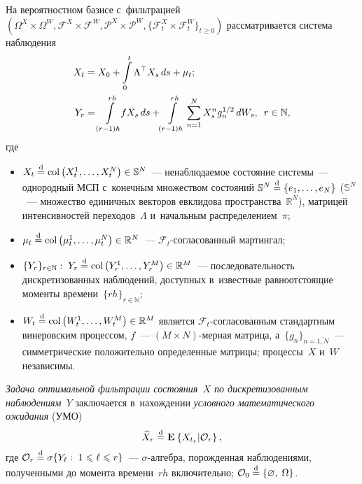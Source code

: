 \begin{multicols}{2}
 На вероятностном базисе с~фильтрацией\linebreak 
 $(\Omega^X \times \Omega^W,\mathcal{F}^X \times \mathcal{F}^W,
 \mathcal{P}^X \times \mathcal{P}^W, \{\mathcal{F}^X_t 
 \times \mathcal{F}^W_t\}_{t \geqslant 0})$ рас\-смат\-ри\-ва\-ет\-ся система наблюдения
\begin{align*}
 \displaystyle X_t &=X_0 + \int\limits_0^t \Lambda^{\top}X_{s}\,ds + \mu_t;  \\
 \displaystyle Y_r &= \int\limits_{(r-1)h}^{rh} \!\! fX_s\,ds+\!
 \int\limits_{(r-1)h}^{rh} \sum\limits_{n=1}^NX_s^ng_n^{1/2}\, dW_s,\enskip 
 r \in \mathbb{N},
 \end{align*}
 где
  \begin{itemize}
  \item
  $X_t  \eqd \col\left(X_t^1,\ldots,X_t^N\right) \hm\in \mathbb{S}^N$~--- 
  не\-на\-блю\-да\-емое состояние системы~--- однородный МСП с~конечным множеством 
  состояний $ \mathbb{S}^N \hm \eqd \{e_1,\ldots,e_N\}$ ($\mathbb{S}^N$~--- 
  множество единичных векторов евклидова пространства~$\mathbb{R}^N$), 
  матрицей интенсивностей переходов~$\Lambda$ и~начальным распределением~$\pi$;
  \item
  $\mu_t \eqd \col\left(
  \mu_t^1,\ldots,\mu_t^N\right)\hm\in \mathbb{R}^N$~--- $\mathcal{F}_t$-со\-гла\-со\-ван\-ный 
  мартингал;
  \item
  $\{Y_r\}_{r \in \mathbb{N}}:\;  Y_r \eqd \col\left(Y_r^1,\ldots,Y_r^M\right) 
  \hm\in \mathbb{R}^M$~--- последовательность дискретизованных наблюдений, 
  доступных в~известные равноотстоящие моменты времени~$\{rh\}_{r \in \mathbb{N}}$;
 \item
 $W_t \eqd \col\left(W_t^1,\ldots,W_t^M\right) \hm\in \mathbb{R}^M$ является 
 $\mathcal{F}_t$-со\-гла\-со\-ван\-ным стандартным винеровским процессом,  $f$~--- 
 $(M \times N)$-мер\-ная матрица, 
 а~$\{g_n\}_{n=\overline{1,N}}$~--- симметрические положительно определенные 
 матрицы; процессы~$X$ и~$W$ независимы.
  \end{itemize}
  
   \textit{Задача оптимальной фильтрации состояния~$X$ 
   по дискретизованным наблюдениям~$Y$} заключается в~нахождении 
   \textit{условного математического ожидания} (УМО)
  \begin{equation}
  \widehat{X}_r \stackrel{\mathrm{d}}{=} \mathbf{E}_{  }\left\{ \mathop{X_{t_r}|\mathcal{O}_{r} } \right\},
  \label{eq:fest_1}
  \end{equation}
  где $\mathcal{O}_r \stackrel{\mathrm{d}}{=} \sigma\{ Y_{\ell}: \; 1 \leqslant \ell \leqslant r\}$~--- 
  $\sigma$-ал\-геб\-ра, по\-рож\-ден\-ная наблюдениями, полученными до момента времени~$rh$ 
  включительно; $\mathcal{O}_0 \stackrel{\mathrm{d}}{=} \{\varnothing,\; \Omega\}$.
  

\end{multicols}

